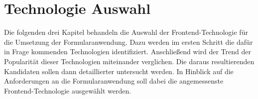 \chapter{Technologie Auswahl}
\label{chap:Technologie-Auswahl}

Die folgenden drei Kapitel behandeln die Auswahl der Frontend-Technologie für die Umsetzung der Formularanwendung.
Dazu  werden im ersten Schritt die dafür in Frage kommenden Technologien identifiziert.
 Anschließend wird der Trend der Popularität dieser Technologien miteinander verglichen.
Die daraus resultierenden Kandidaten sollen dann  detaillierter untersucht werden.
In Hinblick auf die Anforderungen an die Formularanwendung soll dabei die angemessenste Frontend-Technologie ausgewählt werden.






